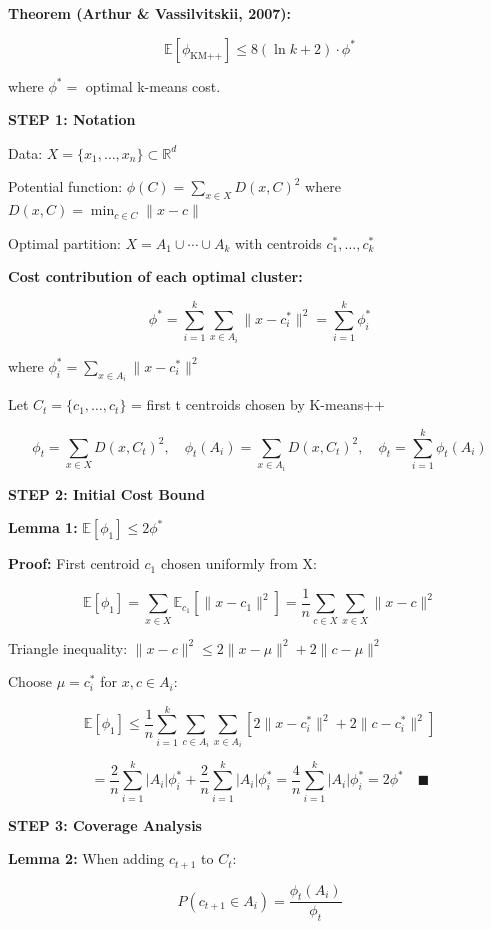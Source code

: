 \documentclass[12pt]{article}
\begin{document}
\begin{solution}
\textbf{Theorem (Arthur \& Vassilvitskii, 2007):}

\[
\mathbb{E}[\phi_{\text{KM++}}] \leq 8(\ln k + 2) \cdot \phi^*
\]

where $\phi^* = $ optimal k-means cost.

\textbf{STEP 1: Notation}

Data: $X = \{x_1, \ldots, x_n\} \subset \mathbb{R}^d$

Potential function: $\phi(C) = \sum_{x \in X} D(x, C)^2$ where $D(x, C) = \min_{c \in C} \|x - c\|$

Optimal partition: $X = A_1 \cup \cdots \cup A_k$ with centroids $c_1^*, \ldots, c_k^*$

\textbf{Cost contribution of each optimal cluster:}

\[
\phi^* = \sum_{i=1}^k \sum_{x \in A_i} \|x - c_i^*\|^2 = \sum_{i=1}^k \phi_i^*
\]

where $\phi_i^* = \sum_{x \in A_i} \|x - c_i^*\|^2$

Let $C_t = \{c_1, \ldots, c_t\}$ = first t centroids chosen by K-means++

\[
\phi_t = \sum_{x \in X} D(x, C_t)^2, \quad \phi_t(A_i) = \sum_{x \in A_i} D(x, C_t)^2, \quad \phi_t = \sum_{i=1}^k \phi_t(A_i)
\]

\textbf{STEP 2: Initial Cost Bound}

\textbf{Lemma 1:} $\mathbb{E}[\phi_1] \leq 2\phi^*$

\textbf{Proof:} First centroid $c_1$ chosen uniformly from X:

\[
\mathbb{E}[\phi_1] = \sum_{x \in X} \mathbb{E}_{c_1}[\|x - c_1\|^2] = \frac{1}{n}\sum_{c \in X}\sum_{x \in X}\|x - c\|^2
\]

Triangle inequality: $\|x - c\|^2 \leq 2\|x - \mu\|^2 + 2\|c - \mu\|^2$

Choose $\mu = c_i^*$ for $x, c \in A_i$:

\[
\mathbb{E}[\phi_1] \leq \frac{1}{n}\sum_{i=1}^k \sum_{c \in A_i}\sum_{x \in A_i} [2\|x - c_i^*\|^2 + 2\|c - c_i^*\|^2]
\]

\[
= \frac{2}{n}\sum_{i=1}^k |A_i| \phi_i^* + \frac{2}{n}\sum_{i=1}^k |A_i| \phi_i^* = \frac{4}{n}\sum_{i=1}^k |A_i| \phi_i^* = 2\phi^* \quad \blacksquare
\]

\textbf{STEP 3: Coverage Analysis}

\textbf{Lemma 2:} When adding $c_{t+1}$ to $C_t$:

\[
P(c_{t+1} \in A_i) = \frac{\phi_t(A_i)}{\phi_t}
\]


\end{solution}
\end{document}
